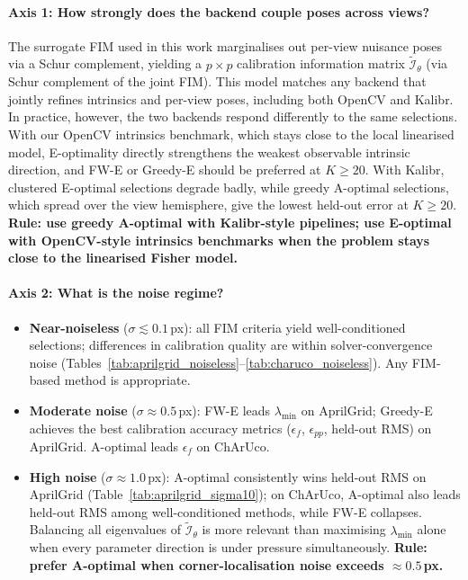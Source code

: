 \documentclass[letterpaper, 9
 pt, conference]{ieeeconf}
\begin{document}
\paragraph{Axis 1: How strongly does the backend couple poses across views?}
The surrogate FIM used in this work marginalises out per-view nuisance poses
via a Schur complement, yielding a $p{\times}p$ calibration information matrix
$\widetilde{\mathcal{I}}_\theta$ (via Schur complement of the joint FIM).
This model matches any backend that jointly refines intrinsics and
per-view poses, including both OpenCV and Kalibr. In practice, however, the
two backends respond differently to the same selections. With our OpenCV
intrinsics benchmark, which stays close to the local linearised model,
E-optimality directly strengthens the weakest observable intrinsic direction,
and FW-E or Greedy-E should be preferred at $K{\ge}20$.
With Kalibr, clustered E-optimal selections degrade badly, while greedy
A-optimal selections, which spread over the view hemisphere, give the lowest
held-out error at $K\ge20$.
\textbf{Rule: use greedy A-optimal with Kalibr-style pipelines; use E-optimal with OpenCV-style intrinsics benchmarks when the problem stays close to the linearised Fisher model.}

\paragraph{Axis 2: What is the noise regime?}
\begin{itemize}[leftmargin=1.5em]
  \item \textbf{Near-noiseless} ($\sigma{\lesssim}0.1$\,px): all FIM criteria
  yield well-conditioned selections; differences in calibration quality are
  within solver-convergence noise
  (Tables~\ref{tab:aprilgrid_noiseless}--\ref{tab:charuco_noiseless}).
  Any FIM-based method is appropriate.
  \item \textbf{Moderate noise} ($\sigma{\approx}0.5$\,px): FW-E leads
  $\lambda_{\min}$ on AprilGrid; Greedy-E achieves the best calibration accuracy
  metrics ($\epsilon_f$, $\epsilon_{pp}$, held-out RMS) on AprilGrid.
  A-optimal leads $\epsilon_f$ on ChArUco.
  \item \textbf{High noise} ($\sigma{\approx}1.0$\,px): A-optimal consistently
  wins held-out RMS on AprilGrid (Table~\ref{tab:aprilgrid_sigma10}); on
  ChArUco, A-optimal also leads held-out RMS among well-conditioned methods,
  while FW-E collapses.
  Balancing all eigenvalues of $\widetilde{\mathcal{I}}_\theta$ is more
  relevant than maximising $\lambda_{\min}$ alone when every parameter
  direction is under pressure simultaneously.
  \textbf{Rule: prefer A-optimal when corner-localisation noise exceeds
  ${\approx}0.5$\,px.}
\end{itemize}
\end{document}
